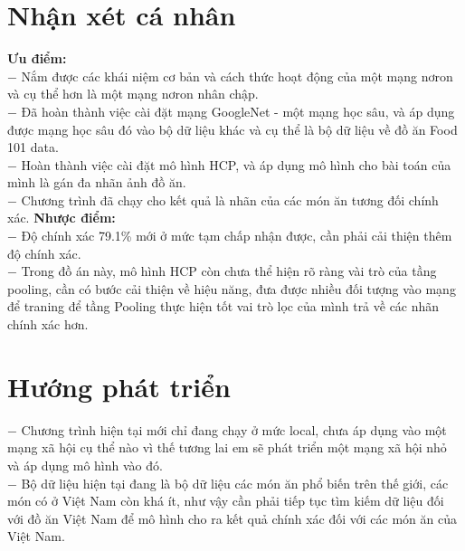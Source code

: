 \documentclass[13pt, a4paper]{extreport}
\begin{document}
\section {Nhận xét cá nhân}
\indent \textbf{Ưu điểm:}\\
\indent $-$ Nắm được các khái niệm cơ bản và cách thức hoạt động của một mạng nơron và cụ thể hơn là một mạng nơron nhân chập.\\
\indent $-$ Đã hoàn thành việc cài đặt mạng GoogleNet - một mạng học sâu, và áp dụng được mạng học sâu đó vào bộ dữ liệu khác và cụ thể là bộ dữ liệu về đồ ăn Food 101 data.\\
\indent $-$ Hoàn thành việc cài đặt mô hình HCP, và áp dụng mô hình cho bài toán của mình là gán đa nhãn ảnh đồ ăn.\\
\indent $-$ Chương trình đã chạy cho kết quả là nhãn của các món ăn tương đối chính xác.
\indent \textbf{Nhược điểm:}\\
\indent $-$ Độ chính xác 79.1\% mới ở mức tạm chấp nhận được, cần phải cải thiện thêm độ chính xác.\\
\indent $-$ Trong đồ án này, mô hình HCP còn chưa thể hiện rõ ràng vài trò của tầng pooling, cần có bước cải thiện về hiệu năng, đưa được nhiều đối tượng vào mạng để traning để tầng Pooling thực hiện tốt vai trò lọc của mình trả về các nhãn chính xác hơn.

\section {Hướng phát triển}
\indent $-$ Chương trình hiện tại mới chỉ đang chạy ở mức local, chưa áp dụng vào một mạng xã hội cụ thể nào vì thế tương lai em sẽ phát triển một mạng xã hội nhỏ và áp dụng mô hình vào đó.\\
\indent $-$ Bộ dữ liệu hiện tại đang là bộ dữ liệu các món ăn phổ biến trên thế giới, các món có ở Việt Nam còn khá ít, như vậy cần phải tiếp tục tìm kiếm dữ liệu đối với đồ ăn Việt Nam để mô hình cho ra kết quả chính xác đối với các món ăn của Việt Nam.
\end{document}

